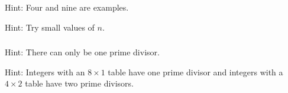 \subsubsection*{ \answers}
\begin{apart}
    \item Hint: Four and nine are examples.
    \item Hint: Try small values of $n$.
\end{apart}

\subsubsection*{ \answers}
\begin{apart}
    \item Hint: There can only be one prime divisor.
    \item Hint: Integers with an $8 \times 1$ table have one prime divisor and integers with a $4 \times 2$ table have two prime divisors.
\end{apart}


